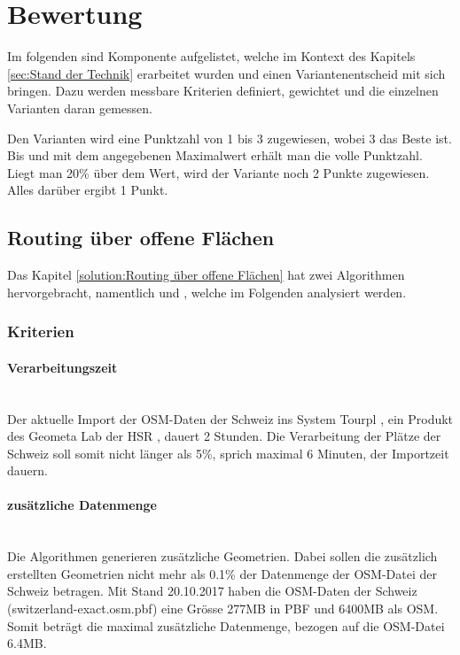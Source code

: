 \section{Bewertung}
\label{sec:Bewertung}
Im folgenden sind Komponente aufgelistet, welche im Kontext des Kapitels \ref{sec:Stand der Technik} erarbeitet wurden und einen Variantenentscheid mit sich bringen. Dazu werden messbare Kriterien definiert, gewichtet und die einzelnen Varianten daran gemessen.

Den Varianten wird eine Punktzahl von 1 bis 3 zugewiesen, wobei 3 das Beste ist. Bis und mit dem angegebenen Maximalwert erhält man die volle Punktzahl. Liegt man 20\% über dem Wert, wird der Variante noch 2 Punkte zugewiesen. Alles darüber ergibt 1 Punkt.

\subsection{Routing über offene Flächen}
\label{eval:Routing über offene Flächen}

Das Kapitel \ref{solution:Routing über offene Flächen} hat zwei Algorithmen hervorgebracht, namentlich  und , welche im Folgenden analysiert werden.

\subsubsection{Kriterien}
\label{sub:Kriterien}

\paragraph{Verarbeitungszeit}\label{criteria:Verarbeitungszeit}~\\
Der aktuelle Import der \ac{OSM}-Daten der Schweiz ins System Tourpl \cite{hsr_tourpl}, ein Produkt des Geometa Lab der HSR \cite{geometa_lab_hsr}, dauert 2 Stunden. Die Verarbeitung der Plätze der Schweiz soll somit nicht länger als 5\%, sprich maximal 6 Minuten, der Importzeit dauern. 


\paragraph{zusätzliche Datenmenge}\label{criteria:zusätzliche Datenmenge}~\\
Die Algorithmen generieren zusätzliche Geometrien. Dabei sollen die zusätzlich erstellten Geometrien nicht mehr als 0.1\% der Datenmenge der \ac{OSM}-Datei der Schweiz \cite{osm_data_switzerland} betragen. Mit Stand 20.10.2017 haben die \ac{OSM}-Daten der Schweiz (switzerland-exact.osm.pbf) eine Grösse 277MB in PBF und 6400MB als \ac{OSM}. Somit beträgt die maximal zusätzliche Datenmenge, bezogen auf die \ac{OSM}-Datei 6.4MB.


